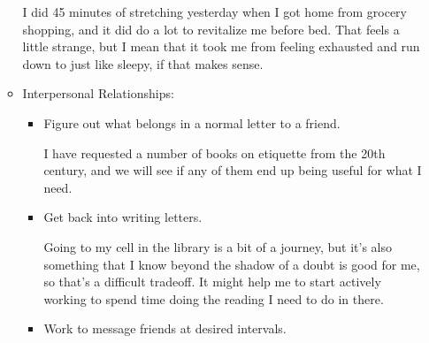 \documentclass[12pt]{article}[titlepage]
\renewcommand{\,}{\textsuperscript{,}}
\begin{document}
\begin{itemize}
\begin{itemize}
I did 45 minutes of stretching yesterday when I got home from grocery shopping, and it did do a lot to revitalize me before bed.  
That feels a little strange, but I mean that it took me from feeling exhausted and run down to just like sleepy, if that makes sense.

\item Interpersonal Relationships:  
\begin{itemize}   
\item Figure out what belongs in a normal letter to a friend.

I have requested a number of books on etiquette from the 20th century, and we will see if any of them end up being useful for what I need.  
\item Get back into writing letters.

Going to my cell in the library is a bit of a journey, but it's also something that I know beyond the shadow of a doubt is good for me, so that's a difficult tradeoff. It might help me to start actively working to spend time doing the reading I need to do in there.  
\item Work to message friends at desired intervals.


\end{itemize}
\end{itemize}
\end{itemize}
\end{document}
